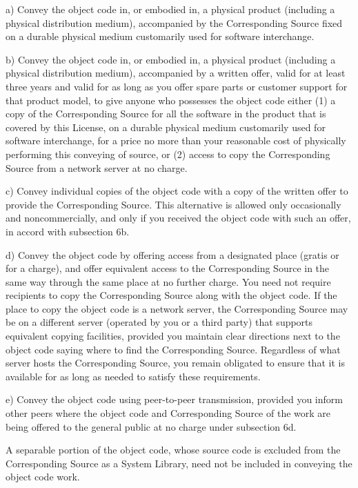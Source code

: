 \begin{DoxyItemize}
\item a) Convey the object code in, or embodied in, a physical product (including a physical distribution medium), accompanied by the Corresponding Source fixed on a durable physical medium customarily used for software interchange.
\item b) Convey the object code in, or embodied in, a physical product (including a physical distribution medium), accompanied by a written offer, valid for at least three years and valid for as long as you offer spare parts or customer support for that product model, to give anyone who possesses the object code either (1) a copy of the Corresponding Source for all the software in the product that is covered by this License, on a durable physical medium customarily used for software interchange, for a price no more than your reasonable cost of physically performing this conveying of source, or (2) access to copy the Corresponding Source from a network server at no charge.
\item c) Convey individual copies of the object code with a copy of the written offer to provide the Corresponding Source. This alternative is allowed only occasionally and noncommercially, and only if you received the object code with such an offer, in accord with subsection 6b.
\item d) Convey the object code by offering access from a designated place (gratis or for a charge), and offer equivalent access to the Corresponding Source in the same way through the same place at no further charge. You need not require recipients to copy the Corresponding Source along with the object code. If the place to copy the object code is a network server, the Corresponding Source may be on a different server (operated by you or a third party) that supports equivalent copying facilities, provided you maintain clear directions next to the object code saying where to find the Corresponding Source. Regardless of what server hosts the Corresponding Source, you remain obligated to ensure that it is available for as long as needed to satisfy these requirements.
\item e) Convey the object code using peer-\/to-\/peer transmission, provided you inform other peers where the object code and Corresponding Source of the work are being offered to the general public at no charge under subsection 6d.
\end{DoxyItemize}

A separable portion of the object code, whose source code is excluded from the Corresponding Source as a System Library, need not be included in conveying the object code work.

